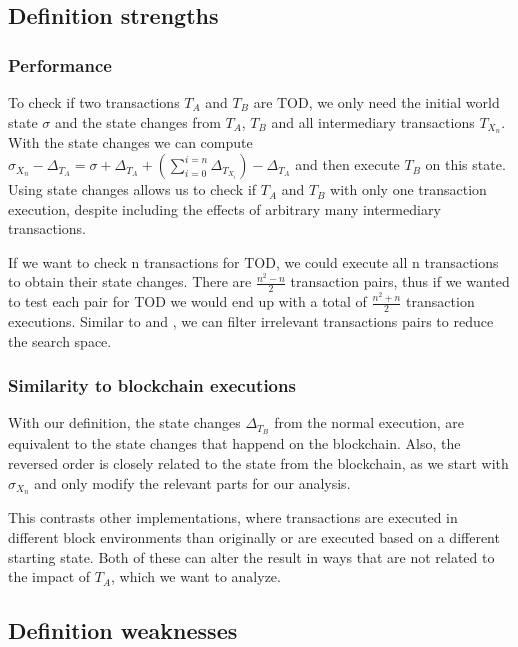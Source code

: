 \documentclass[draft,final]{vutinfth} %
\begin{document}
\subsection{Definition strengths}

\subsubsection{Performance}

To check if two transactions $T_A$ and $T_B$ are TOD, we only need the initial world state $\sigma$ and the state changes from $T_A$, $T_B$ and all intermediary transactions $T_{X_n}$. With the state changes we can compute $\sigma_{X_n} - \Delta_{T_A} = \sigma + \Delta_{T_A} + (\sum_{i=0}^{i=n} \Delta_{T_{X_i}}) - \Delta_{T_A}$ and then execute $T_B$ on this state. Using state changes allows us to check if $T_A$ and $T_B$ with only one transaction execution, despite including the effects of arbitrary many intermediary transactions.

If we want to check n transactions for TOD, we could execute all n transactions to obtain their state changes. There are $\frac{n^2 - n}{2}$ transaction pairs, thus if we wanted to test each pair for TOD we would end up with a total of $\frac{n^2 + n}{2}$ transaction executions. Similar to \cite{torres_frontrunner_2021} and \cite{zhang_combatting_2023}, we can filter irrelevant transactions pairs to reduce the search space.

\subsubsection{Similarity to blockchain executions}

With our definition, the state changes $\Delta_{T_B}$ from the normal execution, are equivalent to the state changes that happend on the blockchain. Also, the reversed order is closely related to the state from the blockchain, as we start with $\sigma_{X_n}$ and only modify the relevant parts for our analysis.

This contrasts other implementations, where transactions are executed in different block environments than originally or are executed based on a different starting state. Both of these can alter the result in ways that are not related to the impact of $T_A$, which we want to analyze.

\subsection{Definition weaknesses}
\label{sec:weaknesses}
\end{document}
